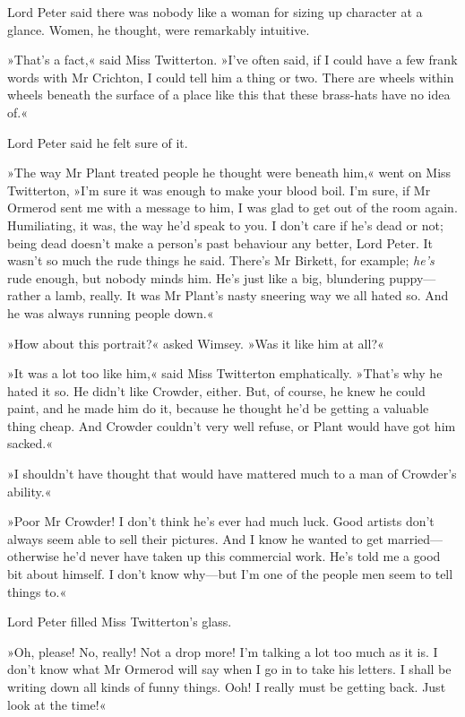 Lord Peter said there was nobody like a woman for sizing up character at a glance. Women, he thought, were remarkably intuitive.

»That's a fact,« said Miss Twitterton. »I've often said, if I could have a few frank words with Mr Crichton, I could tell him a thing or two. There are wheels within wheels beneath the surface of a place like this that these brass-hats have no idea of.«

Lord Peter said he felt sure of it.

»The way Mr Plant treated people he thought were beneath him,« went on Miss Twitterton, »I'm sure it was enough to make your blood boil. I'm sure, if Mr Ormerod sent me with a message to him, I was glad to get out of the room again. Humiliating, it was, the way he'd speak to you. I don't care if he's dead or not; being dead doesn't make a person's past behaviour any better, Lord Peter. It wasn't so much the rude things he said. There's Mr Birkett, for example; \textit{he's} rude enough, but nobody minds him. He's just like a big, blundering puppy—rather a lamb, really. It was Mr Plant's nasty sneering way we all hated so. And he was always running people down.«

»How about this portrait?« asked Wimsey. »Was it like him at all?«

»It was a lot too like him,« said Miss Twitterton emphatically. »That's why he hated it so. He didn't like Crowder, either. But, of course, he knew he could paint, and he made him do it, because he thought he'd be getting a valuable thing cheap. And Crowder couldn't very well refuse, or Plant would have got him sacked.«

»I shouldn't have thought that would have mattered much to a man of Crowder's ability.«

»Poor Mr Crowder! I don't think he's ever had much luck. Good artists don't always seem able to sell their pictures. And I know he wanted to get married—otherwise he'd never have taken up this commercial work. He's told me a good bit about himself. I don't know why—but I'm one of the people men seem to tell things to.«

Lord Peter filled Miss Twitterton's glass.

»Oh, please! No, really! Not a drop more! I'm talking a lot too much as it is. I don't know what Mr Ormerod will say when I go in to take his letters. I shall be writing down all kinds of funny things. Ooh! I really must be getting back. Just look at the time!«

